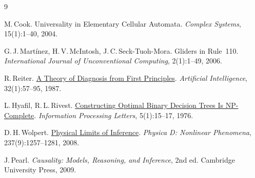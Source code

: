 \documentclass[11pt,a4paper]{article}
\theoremstyle{cleanthm}
\begin{document}
\begin{thebibliography}{9}
\small\setlength{\itemsep}{2pt}

M.\,Cook. Universality in Elementary Cellular Automata. \emph{Complex Systems}, 15(1):1--40, 2004.

G.\,J.\,Mart\'inez, H.\,V.\,McIntosh, J.\,C.\,Seck-Tuoh-Mora. Gliders in Rule~110. \emph{International Journal of Unconventional Computing}, 2(1):1--49, 2006.

R.\,Reiter. \href{https://doi.org/10.1016/0004-3702(87)90062-2}{A Theory of Diagnosis from First Principles}. \emph{Artificial Intelligence}, 32(1):57--95, 1987.

L.\,Hyafil, R.\,L.\,Rivest. \href{https://www.sciencedirect.com/science/article/abs/pii/0020019076900958}{Constructing Optimal Binary Decision Trees Is NP-Complete}. \emph{Information Processing Letters}, 5(1):15--17, 1976.

D.\,H.\,Wolpert. \href{https://doi.org/10.1016/j.physd.2008.03.040}{Physical Limits of Inference}. \emph{Physica D: Nonlinear Phenomena}, 237(9):1257--1281, 2008.

J.\,Pearl. \emph{Causality: Models, Reasoning, and Inference}, 2nd ed. Cambridge University Press, 2009.

\end{thebibliography}
\end{document}
